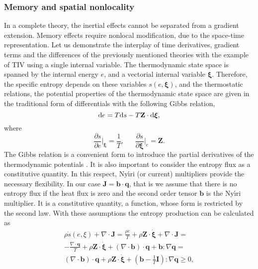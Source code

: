 \documentclass[sn-mathphys]{sn-jnl}%
\theoremstyle{thmstyleone}%
\theoremstyle{thmstyletwo}%
\theoremstyle{thmstylethree}%
\begin{document}
{\subsubsection{Memory and spatial nonlocality}
In a complete theory, the inertial effects cannot be separated from a gradient extension. Memory effects require nonlocal modification, due to the space-time representation. Let us demonstrate the interplay of time derivatives, gradient terms and the differences of the previously mentioned theories with the example of TIV using a single internal variable. The thermodynamic state space is spanned by the internal energy $e$, and a vectorial internal variable $\boldsymbol{\boldsymbol{\xi}}$. Therefore, the specific entropy depends on these variables $s(e,\boldsymbol{\xi})$, and the thermostatic relations, the potential properties of the thermodynamic state space are given in the traditional form of differentials with the following Gibbs relation,
\begin{equation}
	{\rm d}e = T{\rm d}s - T {\mathbf Z}\cdot {\rm d}\boldsymbol{\xi},
	\label{Grel}
\end{equation}
where
\begin{equation}
	\nonumber
	\frac{\partial s}{\partial e}\vert_{\boldsymbol{\xi}} = \frac{1}{T}, \ \ \ \ \ \ \
	\frac{\partial s}{\partial \boldsymbol{\xi}}\vert_{e} =  \mathbf Z.
\end{equation}
The Gibbs relation is a convenient form to introduce the partial derivatives of the thermodynamic potentials \cite{BerVan17b}. It is also important to consider the entropy flux as a constitutive quantity. In this respect, Ny\'\i{}ri (or current) multipliers provide the necessary flexibility. In our case $\mathbf J =\mathbf b\cdot\mathbf q$, that is we assume that there is no entropy flux if the heat flux is zero and the second order tensor $\mathbf b$ is the Ny\'\i{}ri multiplier. It is a constitutive quantity, a function, whose form is restricted by the second law. With these assumptions the entropy production can be calculated as
\begin{eqnarray}
	\rho \dot s(e,\xi)+\nabla\cdot {\mathbf J} = \frac{\rho \dot e}{T} + \rho{\mathbf Z}\cdot \boldsymbol{\dot\xi} + \nabla\cdot{\mathbf J} = \nonumber\\
	-\frac{\nabla\cdot{\mathbf q}}{T} + \rho {\mathbf Z}\cdot\boldsymbol{\dot\xi} + (\nabla\cdot {\mathbf b})\cdot {\mathbf q} + {\mathbf b}:\nabla {\mathbf q} = \nonumber\\
	(\nabla\cdot {\mathbf b})\cdot {\mathbf q} + \rho {\mathbf Z}\cdot\boldsymbol{\dot\xi} +\left({\mathbf b} - \frac{1}{T}{\mathbf I}\right):\nabla {\mathbf q}\geq 0,

\end{eqnarray}}
\end{document}
